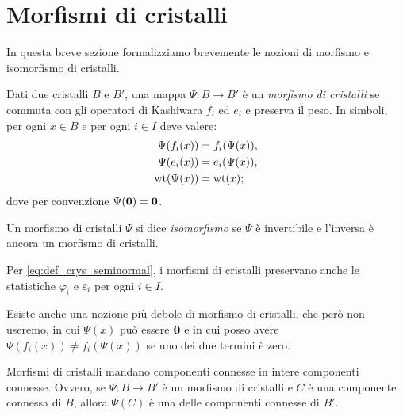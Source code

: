% 

\section{Morfismi di cristalli}

In questa breve sezione formalizziamo brevemente le nozioni di 
morfismo e isomorfismo di cristalli.

\begin{definition}
    Dati due cristalli $B$ e $B'$, una mappa $\Psi \colon B \to B'$ \`e un 
    \emph{morfismo di cristalli} se commuta con gli operatori di Kashiwara $f_i$ ed $e_i$
    e preserva il peso.
    In simboli, per ogni $x \in B$ e per ogni $i \in I$ deve valere:
    \begin{align*}
        \Psi (f_i(x)) &= f_i ( \Psi(x)), \\
        \Psi (e_i(x)) &= e_i ( \Psi(x)), \\
        \operatorname{wt}( \Psi (x)) &= \operatorname{wt} (x);
    \end{align*}
    dove per convenzione $\Psi(\mathbf{0}) = \mathbf{0}$.

    Un morfismo di cristalli $\Psi$ si dice \emph{isomorfismo} se $\Psi$ \`e invertibile
    e l'inversa \`e ancora un morfismo di cristalli.
\end{definition}

\begin{remark}
    Per \eqref{eq:def_crys_seminormal}, i morfismi di cristalli preservano
    anche le statistiche $\varphi_i$ e $\varepsilon_i$
    per ogni $i \in I$.
\end{remark}

Esiste anche una nozione pi\`u debole di morfismo di cristalli, che per\`o non useremo,
in cui $\Psi(x)$ pu\`o essere $\mathbf{0}$ e in cui posso avere
$\Psi (f_i(x)) \neq f_i ( \Psi(x))$ se uno dei due termini \`e zero.

\begin{proposition}
    Morfismi di cristalli mandano componenti connesse in intere componenti connesse.
    Ovvero, se $\Psi \colon B \to B'$ \`e un morfismo di cristalli e $C$ \`e una
    componente connessa di $B$, allora $\Psi(C)$ è una delle componenti connesse
    di $B'$.
\end{proposition}

